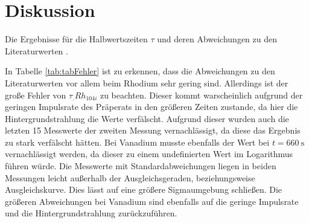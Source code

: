 
\section{Diskussion}
\label{sec:Diskussion}

\begin{table}
	\centering
	\caption{Die Ergebnisse für die Halbwertszeiten $\tau$ und deren Abweichungen zu den Literaturwerten\cite{Halbwertszeiten} .}
	
	\label{tab:tabFehler}
\end{table}

\noindent In Tabelle \ref{tab:tabFehler} ist zu erkennen, dass die Abweichungen zu den Literaturwerten vor allem beim Rhodium sehr gering sind. Allerdings ist der große Fehler von $\tau_.{Rh_{104i}}$ zu beachten. Dieser kommt warscheinlich aufgrund der geringen Impulsrate des Präperats in den größeren Zeiten zustande, da hier die Hintergrundstrahlung die Werte verfälscht. Aufgrund dieser wurden auch die letzten 15 Messwerte der zweiten Messung vernachlässigt, da diese das Ergebnis zu stark verfälscht hätten. Bei Vanadium musste ebenfalls der Wert bei $t=\SI{660}{\second}$ vernachlässigt werden, da dieser zu einem undefinierten Wert im Logarithmus führen würde. Die Messwerte mit Standardabweichungen liegen in beiden Messungen leicht außerhalb der Ausgleichsgeraden, beziehungsweise Ausgleichskurve. Dies lässt auf eine größere Sigmaumgebung schließen. Die größeren Abweichungen bei Vanadium sind ebenfalls auf die geringe Impulsrate und die Hintergrundstrahlung zurückzuführen.       
